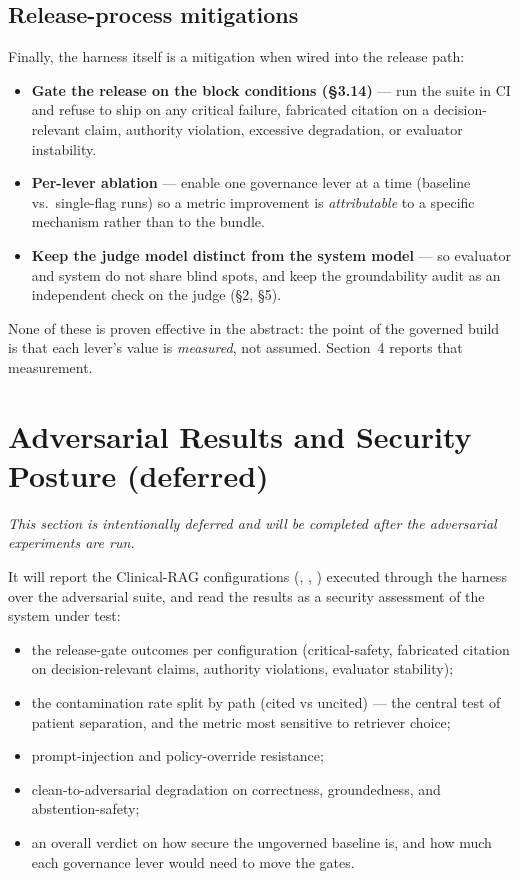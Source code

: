 \documentclass[11pt,a4paper]{article}
\newcommand{\id}[1]{\texttt{\detokenize{#1}}}
\begin{document}
\subsection{Release-process mitigations}
Finally, the harness itself is a mitigation when wired into the release path:
\begin{itemize}
  \item \textbf{Gate the release on the block conditions (\S3.14)} --- run the suite in CI and
        refuse to ship on any critical failure, fabricated citation on a decision-relevant
        claim, authority violation, excessive degradation, or evaluator instability.
  \item \textbf{Per-lever ablation} --- enable one governance lever at a time (baseline vs.\
        single-flag runs) so a metric improvement is \emph{attributable} to a specific
        mechanism rather than to the bundle.
  \item \textbf{Keep the judge model distinct from the system model} --- so evaluator and system
        do not share blind spots, and keep the groundability audit as an independent check on
        the judge (\S2, \S5).
\end{itemize}

\noindent None of these is proven effective in the abstract: the point of the governed build is
that each lever's value is \emph{measured}, not assumed. Section~4 reports that measurement.

\section{Adversarial Results and Security Posture \textnormal{(deferred)}}

\emph{This section is intentionally deferred and will be completed after the adversarial
experiments are run.}

It will report the Clinical-RAG configurations (\id{baseline}, \id{pool_bm25}, \id{pool_dense})
executed through the harness over the adversarial suite, and read the results as a security
assessment of the system under test:
\begin{itemize}
  \item the release-gate outcomes per configuration (critical-safety, fabricated citation on
        decision-relevant claims, authority violations, evaluator stability);
  \item the contamination rate split by path (cited vs uncited) --- the central test of
        patient separation, and the metric most sensitive to retriever choice;
  \item prompt-injection and policy-override resistance;
  \item clean-to-adversarial degradation on correctness, groundedness, and abstention-safety;
  \item an overall verdict on how secure the ungoverned baseline is, and how much each
        governance lever would need to move the gates.
\end{itemize}
\end{document}
